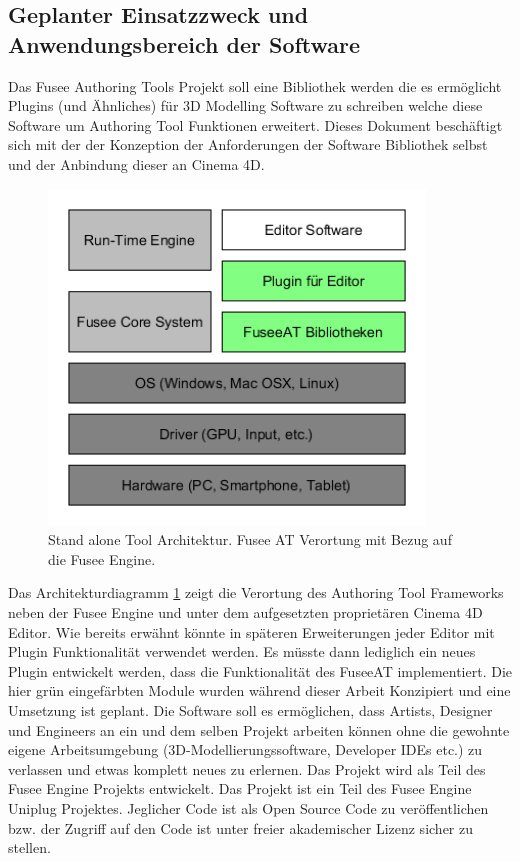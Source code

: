 \documentclass[pagesize, paper=a4, fontsize=12pt, titlepage=true, headings=small, headnosepline, abstractoff, liststotoc, nochapterprefix, plainheadsepline, twoside]{scrreprt}
\begin{document}
\subsection{Geplanter Einsatzzweck und Anwendungsbereich der Software}
Das Fusee Authoring Tools Projekt soll eine Bibliothek werden die es ermöglicht Plugins (und Ähnliches) für 3D Modelling Software zu schreiben welche diese Software um Authoring Tool Funktionen erweitert. Dieses Dokument beschäftigt sich mit der der Konzeption der Anforderungen der Software Bibliothek selbst und der Anbindung dieser an Cinema 4D.

\begin{figure}[ht]
	\centering
	\includegraphics[width=10cm]{Bilder/Engine_Tool_Architektur.png}
	\caption{Stand alone Tool Architektur. Fusee AT Verortung mit Bezug auf die Fusee Engine.}
	\label{FuseeToolBezug}
\end{figure}

Das Architekturdiagramm \ref{FuseeToolBezug} zeigt die Verortung des Authoring Tool Frameworks neben der Fusee Engine und unter dem aufgesetzten proprietären Cinema 4D Editor. Wie bereits erwähnt könnte in späteren Erweiterungen jeder Editor mit Plugin Funktionalität verwendet werden. Es müsste dann lediglich ein neues Plugin entwickelt werden, dass die Funktionalität des FuseeAT implementiert. Die hier grün eingefärbten Module wurden während dieser Arbeit Konzipiert und eine Umsetzung ist geplant.
Die Software soll es ermöglichen, dass Artists, Designer und Engineers an ein und dem selben Projekt arbeiten können ohne die gewohnte eigene Arbeitsumgebung (3D-Modellierungssoftware, Developer IDEs etc.) zu verlassen und etwas komplett neues zu erlernen.
Das Projekt wird als Teil des Fusee Engine Projekts entwickelt. Das Projekt ist ein Teil des Fusee Engine Uniplug Projektes.
Jeglicher Code ist als Open Source Code zu veröffentlichen bzw. der Zugriff auf den Code ist unter freier akademischer Lizenz sicher zu stellen.
\end{document}
